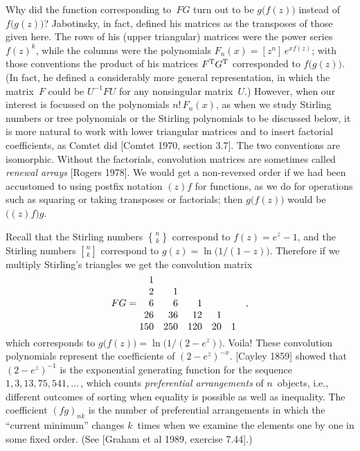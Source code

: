 Why did the function corresponding to~$FG$ turn out to be
$g\bigl(f(z)\bigr)$ instead of $f\bigl(g(z)\bigr)$? Jabotinsky, in
fact, defined his matrices as the transposes of those given here. The
rows of his (upper triangular) matrices were the power series $f(z)^k$,
while the columns were the polynomials $F_n(x)=[z^n]\,e^{xf(z)}$; with
those conventions the product of his matrices $F^{\rm T}G^{\rm T}$
 corresponded to
$f\bigl(g(z)\bigr)$. (In fact, he defined a considerably more general
representation, in which the matrix~$F$ could be $U^{-1}FU$ for any
nonsingular matrix~$U$.)
However, when our interest is focussed on the polynomials
$n!\,F_n(x)$, as when we study Stirling numbers or tree polynomials or
the Stirling polynomials to be discussed below, it is more natural to
work with lower triangular matrices and to insert factorial
coefficients, as Comtet did [Comtet 1970, section 3.7]. The two
conventions are isomorphic. Without the factorials, convolution
matrices are sometimes called {\it renewal arrays\/} [Rogers 1978].
We would get a non-reversed order if we
had been accustomed to using postfix notation $(z)f$ for functions, as
we do for operations such as squaring or taking transposes or
factorials; then $g\bigl(f(z)\bigr)$ would be $\bigl((z)f\bigr)g$. 

Recall that the Stirling numbers ${n\brace k}$ correspond to
$f(z)=e^z-1$, and the Stirling numbers ${n\brack k}$ correspond to
$g(z)=\ln\bigl(1/(1-z)\bigr)$. Therefore if we multiply Stirling's
triangles we get the convolution matrix
$$\vcenter{\halign{\hfil$#\;$&\hfil$#$\quad&\hfil$#$\quad&\hfil$#$\quad
&\hfil$#$\quad&\hfil$#$\quad&\hfil$#$\cr
&1\cr
&2&1\cr
FG=&6&6&1&&&,\cr
&26&36&12&1\cr
&150&250&120&20&1\cr}}$$
which corresponds to $g\bigl(f(z)\bigr)=\ln\bigl(1/(2-e^z)\bigr)$.
Voila!
These convolution polynomials represent the coefficients of
$(2-e^z)^{-x}$. [Cayley 1859] showed that $(2-e^z)^{-1}$ is the
exponential generating function for the sequence
$1,3,13,75,541,\ldots\,$, which counts {\it preferential
arrangements\/} of $n$~objects, i.e., different outcomes of sorting
when equality is possible as well as inequality. The coefficient
$(fg)_{nk}$ is the number of preferential arrangements in which the
``current minimum'' changes $k$~times when we examine the elements one
by one in some fixed order. (See [Graham et al 1989, exercise 7.44].)


